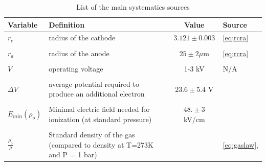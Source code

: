 \begin{table}[htb]
  \begin{tabularx}{\linewidth}{p{1.5cm}|p{6cm}|c|l}
    \textbf{Variable}     & \textbf{Definition}                                                         & \textbf{Value}     & \textbf{Source}  \\
    \hline
    $r_{c}$                 & radius of the cathode                                                       & $3.121 \pm 0.003$      &\ref{eq:rcra}   \\
    &&&\\
    $r_{a}$                 & radius of the anode                                                         & $25 \pm 2 \mu$m &\ref{eq:rcra}   \\
    &&&\\
    $V$                    & operating voltage                                                           & 1-3 kV             & N/A                \\
    &&&\\
    $\Delta V$             & average potential required to produce an additional electron                & $23.6 \pm 5.4$ V   &\cite{gas_detect}   \\
    &&&\\
    $E_{min}(\rho_{o})$      & Minimal electric field needed for ionization (at standard pressure)         & $48. \pm 3$ kV/cm  &\cite{gas_detect}   \\
    &&&\\
    $\frac{\rho_{o}}{\rho}$ & Standard density of the gas (compared to density at  T=273K and P = 1 bar)  &                    &\ref{eq:gaslaw}, \cite{meteo}\\
    \hline
  \end{tabularx}
  \caption{List of the main systematics sources}
  \label{Tab:params}
\end{table}


